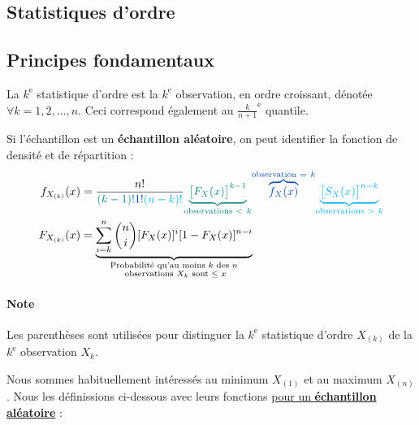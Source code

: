 \documentclass[french]{article}
\begin{document}
\begin{multicols*}{2}
\newpage
\section{Statistiques d'ordre} \label{sec:orderStats}

\subsection{Principes fondamentaux}
\begin{definitionNOHFILL}
La $k^{\text{e}}$ statistique d'ordre est la $k^{\text{e}}$ observation, en ordre croissant, dénotée  $\forall k = 1, 2, \dots, n$. Ceci correspond également au $\frac{k}{n + 1}^{\text{e}}$ quantile.

\bigskip

Si l'échantillon est un \textbf{échantillon aléatoire}, on peut identifier la fonction de densité et de répartition :
\begin{align*}
	f_{X_{(k)}}(x)
	&=	\frac{n!}{\textcolor{teal}{(k - 1)!} \textcolor{cobalt}{1!} \textcolor{cyan}{(n - k)!}} \textcolor{teal}{\underset{\text{observations } < \ k}{\underbrace{\big[ F_{X}(x) \big]^{k - 1}}}} \textcolor{cobalt}{\overset{\text{observation } = \ k}{\overbrace{f_{X}(x)}}} \textcolor{cyan}{\underset{\text{observations } > \ k}{\underbrace{\big[ S_{X}(x) \big]^{n - k}}}} \\
	F_{X_{(k)}}(x)
	&=	\underset{\substack{\text{Probabilité qu'au moins $k$ des $n$}\\ \text{ observations $X_{k}$  sont $\le x$}}}{\underbrace{\sum_{i = k}^{n} \binom{n}{i} [F_{X}(x)]^{i} [1 - F_{X}(x)]^{n - i}}}
\end{align*}


\paragraph{Note}	Les parenthèses sont utilisées pour distinguer la $k^{\text{e}}$ statistique d'ordre $X_{(k)}$ de la $k^{\text{e}}$ observation $X_{k}$.
\end{definitionNOHFILL}

\bigskip

Nous sommes habituellement intéressés au minimum $X_{(1)}$ et au maximum $X_{(n)}$. Nous les définissions ci-dessous avec leurs fonctions \underline{pour un \textbf{échantillon aléatoire}} :


\end{multicols*}
\end{document}
